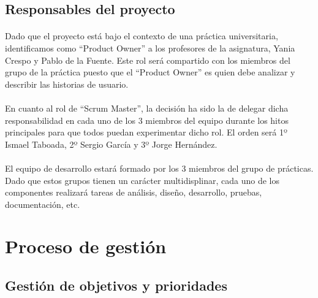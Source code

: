 \documentclass{article}
\begin{document}
		\subsection{Responsables del proyecto}

        	\paragraph{}
       		Dado que el proyecto está bajo el contexto de una práctica universitaria, identificamos como ``Product Owner'' a los profesores de la asignatura, Yania Crespo y Pablo de la Fuente. Este rol será  compartido con los miembros del grupo de la práctica puesto que el ``Product Owner'' es quien debe analizar y describir las historias de usuario.
            
            \paragraph{}
            En cuanto al rol de ``Scrum Master'', la decisión ha sido la de delegar dicha responsabilidad en cada uno de los 3 miembros del equipo durante los hitos principales para que todos puedan experimentar dicho rol. El orden será 1º Ismael Taboada, 2º Sergio García y 3º Jorge Hernández.
            
          	\paragraph{}
			El equipo de desarrollo estará formado por los 3 miembros del grupo de prácticas. Dado que estos grupos tienen un carácter multidisplinar, cada uno de los componentes realizará tareas de análisis, diseño, desarrollo, pruebas, documentación, etc.


        
  	\clearpage    
  	\section{Proceso de gestión}

       	\subsection{Gestión de objetivos y prioridades}
\end{document}
